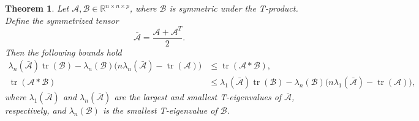 \documentclass[oupthm]{CUP-JNL-BCM}%
\theoremstyle{oupplain}
\newtheorem{theorem}{Theorem}[section]
\theoremstyle{oupdefinition}
\theoremstyle{oupremark}
\theoremstyle{oupproof}
\numberwithin{equation}{section}
\begin{document}
\begin{theorem}
    Let $\mathcal{A}, \mathcal{B} \in \mathbb{R}^{n \times n \times p}$, where $\mathcal{B}$ is symmetric under the T-product. Define the symmetrized tensor
    \[
    \bar{\mathcal{A}} = \frac{\mathcal{A} + \mathcal{A}^T}{2}.
    \]
    Then the following bounds hold
    \[
    \begin{aligned}
    \lambda_n(\bar{\mathcal{A}}) \operatorname{tr}(\mathcal{B}) - \lambda_n(\mathcal{B}) \big(n \lambda_n(\bar{\mathcal{A}}) - \operatorname{tr}(\mathcal{A})\big) &\leq \operatorname{tr}(\mathcal{A} * \mathcal{B}), \\
    \operatorname{tr}(\mathcal{A} * \mathcal{B}) &\leq \lambda_1(\bar{\mathcal{A}}) \operatorname{tr}(\mathcal{B}) - \lambda_n(\mathcal{B}) \big(n \lambda_1(\bar{\mathcal{A}}) - \operatorname{tr}(\mathcal{A})\big),
    \end{aligned}
    \]
    where $\lambda_1(\bar{\mathcal{A}})$ and $\lambda_n(\bar{\mathcal{A}})$ are the largest and smallest T-eigenvalues of $\bar{\mathcal{A}}$, respectively, and $\lambda_n(\mathcal{B})$ is the smallest T-eigenvalue of $\mathcal{B}$.
\end{theorem}
\end{document}
